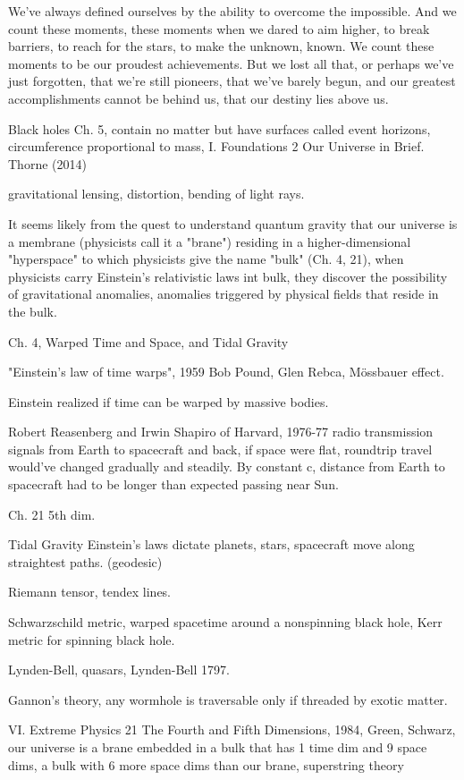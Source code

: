 \documentclass[10pt]{amsart}
\begin{document}
We've always defined ourselves by the ability to overcome the impossible. And we count these moments, these moments when we dared to aim higher, to break barriers, to reach for the stars, to make the unknown, known. We count these moments to be our proudest achievements. But we lost all that, or perhaps we've just forgotten, that we're still pioneers, that we've barely begun, and our greatest accomplishments cannot be behind us, that our destiny lies above us. 


Black holes Ch. 5, contain no matter but have surfaces called event horizons, circumference proportional to mass, I. Foundations 2 Our Universe in Brief. Thorne (2014) \cite{Thor2014}

gravitational lensing, distortion, bending of light rays.

It seems likely from the quest to understand quantum gravity that our universe is a membrane (physicists call it a "brane") residing in a higher-dimensional "hyperspace" to which physicists give the name "bulk" (Ch. 4, 21), when physicists carry Einstein's relativistic laws int bulk, they discover the possibility of gravitational anomalies, anomalies triggered by physical fields that reside in the bulk.

Ch. 4, Warped Time and Space, and Tidal Gravity

"Einstein's law of time warps", 1959 Bob Pound, Glen Rebca, M\"{o}ssbauer effect.

Einstein realized if time can be warped by massive bodies.

Robert Reasenberg and Irwin Shapiro of Harvard, 1976-77 radio transmission signals from Earth to spacecraft and back, if space were flat, roundtrip travel would've changed gradually and steadily. By constant c, distance from Earth to spacecraft had to be longer than expected passing near Sun.

Ch. 21 5th dim.

Tidal Gravity
Einstein's laws dictate planets, stars, spacecraft move along straightest paths. (geodesic)

Riemann tensor, tendex lines.

Schwarzschild metric, warped spacetime around a nonspinning black hole, Kerr metric for spinning black hole.

Lynden-Bell, quasars, Lynden-Bell 1797.

Gannon's theory, any wormhole is traversable only if threaded by exotic matter.

VI. Extreme Physics 21 The Fourth and Fifth Dimensions, 1984, Green, Schwarz, our universe is a brane embedded in a bulk that has 1 time dim and 9 space dims, a bulk with 6 more space dims than our brane, superstring theory
\end{document}
